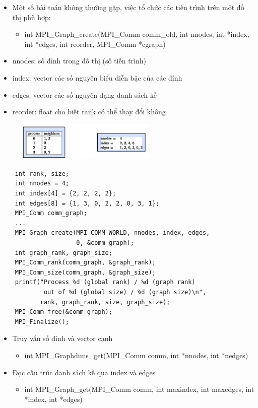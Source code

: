 \documentclass[14pt, a4paper]{article}
\numberwithin{equation}{section}
\numberwithin{figure}{section}
\numberwithin{dl}{section}
\numberwithin{md}{section}
\numberwithin{bd}{section}
\numberwithin{dn}{section}
\numberwithin{hq}{section}
\begin{document}
\begin{itemize}
    \item Một số bài toán không thường gặp, việc tổ chức các tiến trình trên một đồ thị phù hợp:
    \begin{itemize}
        \item int MPI\_Graph\_create(MPI\_Comm comm\_old, int nnodes,
                                     int *index, int *edges,
                                     int reorder, MPI\_Comm *cgraph)           
    \end{itemize}
    \item nnodes: số đỉnh trong đồ thị (số tiến trình)
    \item index: vector các số nguyên biểu diễn bậc của các đỉnh
    \item edges: vector các số nguyên dạng danh sách kề
    \item reorder: float cho biết rank có thể thay đổi không
\end{itemize}

\begin{figure}[H]
    \centering
    \includegraphics[width=0.6\textwidth]{figures/MPI/Graph_Example.png}
\end{figure}

\begin{verbatim}
    int rank, size;
    int nnodes = 4;
    int index[4] = {2, 2, 2, 2};
    int edges[8] = {1, 3, 0, 2, 2, 0, 3, 1};
    MPI_Comm comm_graph;
    ...
    MPI_Graph_create(MPI_COMM_WORLD, nnodes, index, edges, 
                     0, &comm_graph);
    int graph_rank, graph_size;
    MPI_Comm_rank(comm_graph, &graph_rank);
    MPI_Comm_size(comm_graph, &graph_size);
    printf("Process %d (global rank) / %d (graph rank) 
            out of %d (global size) / %d (graph size)\n",
           rank, graph_rank, size, graph_size);
    MPI_Comm_free(&comm_graph);
    MPI_Finalize();
\end{verbatim}

\begin{itemize}
    \item Truy vấn số đỉnh và vector cạnh
    \begin{itemize}
        \item int MPI\_Graphdims\_get(MPI\_Comm comm, int *nnodes,
                                     int *nedges)
    \end{itemize}
    \item Đọc cấu trúc danh sách kề qua index và edges
    \begin{itemize}
        \item int MPI\_Graph\_get(MPI\_Comm comm, int maxindex,
                                  int maxedges, int *index,
                                  int *edges)
    \end{itemize}
\end{itemize}
\end{document}

